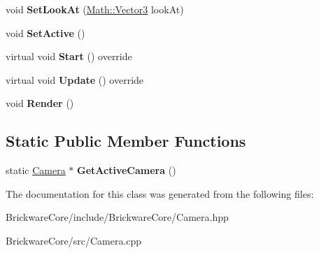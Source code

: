 \begin{DoxyCompactItemize}
\item 
\hypertarget{classBrickware_1_1Core_1_1Camera_a485db9f9dee1300ad5706868ce62556c}{}void {\bfseries Set\+Look\+At} (\hyperlink{classBrickware_1_1Math_1_1Vector3}{Math\+::\+Vector3} look\+At)\label{classBrickware_1_1Core_1_1Camera_a485db9f9dee1300ad5706868ce62556c}

\item 
\hypertarget{classBrickware_1_1Core_1_1Camera_a7412485475d29789f5aabee5c99c82ec}{}void {\bfseries Set\+Active} ()\label{classBrickware_1_1Core_1_1Camera_a7412485475d29789f5aabee5c99c82ec}

\item 
\hypertarget{classBrickware_1_1Core_1_1Camera_ad1e1e6737506ba97eece8b71a3862db7}{}virtual void {\bfseries Start} () override\label{classBrickware_1_1Core_1_1Camera_ad1e1e6737506ba97eece8b71a3862db7}

\item 
\hypertarget{classBrickware_1_1Core_1_1Camera_adba920a003ec354ebaa7d78496d168f1}{}virtual void {\bfseries Update} () override\label{classBrickware_1_1Core_1_1Camera_adba920a003ec354ebaa7d78496d168f1}

\item 
\hypertarget{classBrickware_1_1Core_1_1Camera_ab99417d5df5a3126910d9b027a9af24b}{}void {\bfseries Render} ()\label{classBrickware_1_1Core_1_1Camera_ab99417d5df5a3126910d9b027a9af24b}

\end{DoxyCompactItemize}
\subsection*{Static Public Member Functions}
\begin{DoxyCompactItemize}
\item 
\hypertarget{classBrickware_1_1Core_1_1Camera_a1a13e81a0597c89ca5d330e3dbbabb7c}{}static \hyperlink{classBrickware_1_1Core_1_1Camera}{Camera} $\ast$ {\bfseries Get\+Active\+Camera} ()\label{classBrickware_1_1Core_1_1Camera_a1a13e81a0597c89ca5d330e3dbbabb7c}

\end{DoxyCompactItemize}


The documentation for this class was generated from the following files\+:\begin{DoxyCompactItemize}
\item 
Brickware\+Core/include/\+Brickware\+Core/Camera.\+hpp\item 
Brickware\+Core/src/Camera.\+cpp\end{DoxyCompactItemize}
